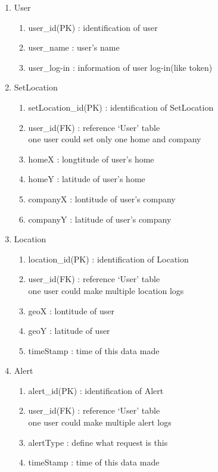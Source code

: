 \documentclass[conference]{IEEEtran}
\begin{document}
\begin{enumerate}
    \item User
    \begin{enumerate}
        \item user\_id(PK) : identification of user
        \item user\_name : user’s name
        \item user\_log-in : information of user log-in(like token)\\
    \end{enumerate}
    
    \item SetLocation
    \begin{enumerate}
        \item setLocation\_id(PK) : identification of SetLocation
        \item user\_id(FK) : reference ‘User’ table \\
	    one user could set only one home and company
	    \item homeX : longtitude of user’s home
	    \item homeY : latitude of user’s home
	    \item companyX : lontitude of user’s company
	    \item companyY : latitude of user’s company\\
    \end{enumerate}
    
    \item Location
    \begin{enumerate}
        \item location\_id(PK) : identification of Location
        \item user\_id(FK) : reference ‘User’ table\\
	    one user could make multiple location logs
        \item geoX : lontitude of user
        \item geoY : latitude of user
        \item timeStamp : time of this data made
    \end{enumerate}
    
    \item Alert
    \begin{enumerate}
        \item alert\_id(PK) : identification of Alert
        \item user\_id(FK) : reference ‘User’ table \\
	    one user could make multiple alert logs
	    \item alertType : define what request is this
	    \item timeStamp : time of this data made\\
    \end{enumerate}
\end{enumerate}
\end{document}
